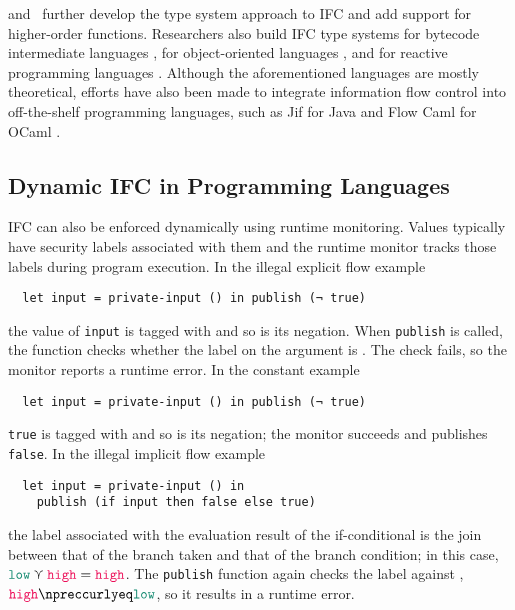 \textcite{heintze1998slam} and~\textcite{zdancewic2002programming} further
develop the type system approach to IFC and add support for higher-order
functions. Researchers also build IFC type systems for bytecode intermediate
languages \autocite{barthe2005non}, for object-oriented languages
\autocite{amtoft2006logic}, and for reactive programming languages
\autocite{bohannon2009reactive}. Although the aforementioned languages are
mostly theoretical, efforts have also been made to integrate information flow
control into off-the-shelf programming languages, such as Jif for Java
\autocite{myers1999jflow} and Flow Caml for OCaml
\autocite{pottier2002information, simonet2003flow}.

\subsection{Dynamic IFC in Programming Languages}
\label{sec:intro-dyn-ifc}


IFC can also be enforced dynamically using runtime monitoring. Values typically
have security labels associated with them and the runtime monitor tracks those
labels during program execution. In the illegal explicit flow example
\begin{verbatim}
  let input = private-input () in publish (¬ true)
\end{verbatim}
the value of \texttt{input} is tagged with \high and so is its negation. When
\texttt{publish} is called, the function checks whether the label on the
argument is \low. The check fails, so the monitor reports a runtime error. In
the constant example
\begin{verbatim}
  let input = private-input () in publish (¬ true)
\end{verbatim}
\texttt{true} is tagged with \low and so is its negation; the monitor succeeds
and publishes \texttt{false}. In the illegal implicit flow example
\begin{verbatim}
  let input = private-input () in
    publish (if input then false else true)
\end{verbatim}
the label associated with the evaluation result of the if-conditional is the
join between that of the branch taken and that of the branch condition; in this
case, $\low \curlyvee \high = \high$. The \texttt{publish} function again checks
the label against \low, $\high \npreccurlyeq \low$, so it results in a runtime
error.

